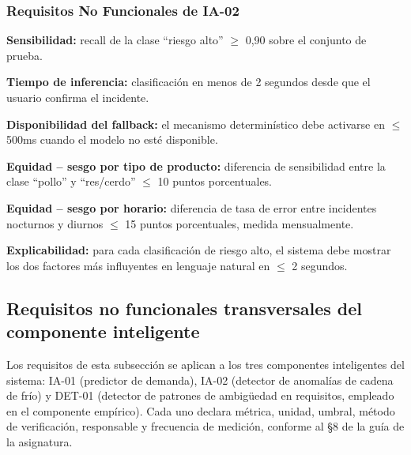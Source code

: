 \documentclass[11pt,a4paper]{article}
\begin{document}
\subsubsection{Requisitos No Funcionales de IA-02}

\begin{description}[nosep]
\item[RNF-IA-07.] \textbf{Sensibilidad:} recall de la clase ``riesgo alto'' $\geq$ 0,90 sobre el conjunto de prueba.
\item[RNF-IA-08.] \textbf{Tiempo de inferencia:} clasificación en menos de 2 segundos desde que el usuario confirma el incidente.
\item[RNF-IA-09.] \textbf{Disponibilidad del fallback:} el mecanismo determinístico debe activarse en $\leq$ 500ms cuando el modelo no esté disponible.
\item[RNF-IA-10.] \textbf{Equidad -- sesgo por tipo de producto:} diferencia de sensibilidad entre la clase ``pollo'' y ``res/cerdo'' $\leq$ 10 puntos porcentuales.
\item[RNF-IA-11.] \textbf{Equidad -- sesgo por horario:} diferencia de tasa de error entre incidentes nocturnos y diurnos $\leq$ 15 puntos porcentuales, medida mensualmente.
\item[RNF-IA-12.] \textbf{Explicabilidad:} para cada clasificación de riesgo alto, el sistema debe mostrar los dos factores más influyentes en lenguaje natural en $\leq$ 2 segundos.
\end{description}


\subsection{Requisitos no funcionales transversales del componente inteligente}

Los requisitos de esta subsección se aplican a los tres componentes
inteligentes del sistema: IA-01 (predictor de demanda), IA-02 (detector de
anomalías de cadena de frío) y DET-01 (detector de patrones de ambigüedad en
requisitos, empleado en el componente empírico). Cada uno declara métrica,
unidad, umbral, método de verificación, responsable y frecuencia de medición,
conforme al §8 de la guía de la asignatura.
\end{document}
